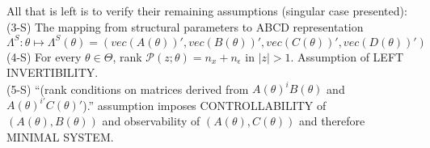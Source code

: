 \documentclass[10pt]{article}
\numberwithin{equation}{section}
\theoremstyle{definition}
\theoremstyle{remark}
\begin{document}
All that is left is to verify their remaining assumptions (singular case presented):\\

(3-S) The mapping from structural parameters to ABCD representation $\Lambda^S : \theta \mapsto \Lambda^S(\theta ) = (vec(A(\theta ))', vec(B(\theta ))', vec(C(\theta ))',vec(D(\theta ))')$\\

(4-S) For every $\theta \in \Theta $, rank $\mathcal{P}(z;\theta ) = n_x + n_\epsilon$ in $|z|>1$.  Assumption of LEFT INVERTIBILITY.\\

(5-S) ``(rank conditions on matrices derived from $A(\theta )^iB(\theta )$ and $A(\theta )^{i'}C(\theta )'$).''  assumption imposes CONTROLLABILITY of $(A(\theta ),B(\theta ))$ and observability of $(A(\theta ), C(\theta ))$ and therefore MINIMAL SYSTEM. 


\pagebreak \appendix
\sloppy
\end{document}
